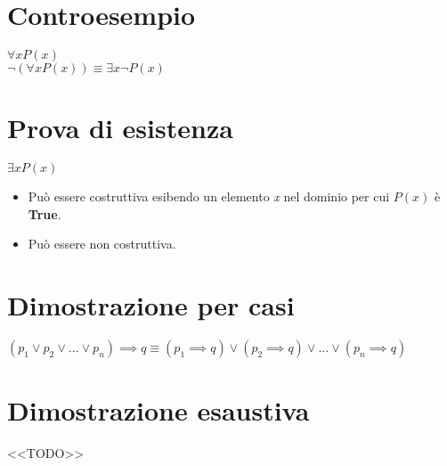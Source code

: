 \section{Controesempio}
$\forall x P(x)$ \\
$\neg(\forall x P(x)) \equiv \exists x\neg P(x)$

\section{Prova di esistenza}
$\exists x P(x)$
\begin{itemize}
    \item Può essere costruttiva esibendo un elemento \textit{x} nel dominio per cui $P(x)$ è \textbf{True}.
    \item Può essere non costruttiva.
\end{itemize}

\section{Dimostrazione per casi}
$(p_1 \vee p_2 \vee ... \vee p_n) \implies q \equiv (p_1 \implies q) \vee (p_2 \implies q) \vee ... \vee (p_n \implies q)$

\section{Dimostrazione esaustiva}
<<TODO>>